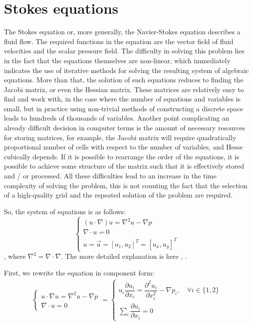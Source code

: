 \section{Stokes equations}
The Stokes equation or, more generally, the Navier-Stokes equation describes a fluid flow. The required functions in the equation are the vector field of fluid velocities and the scalar pressure field. The difficulty in solving this problem lies in the fact that the equations themselves are non-linear, which immediately indicates the use of iterative methods for solving the resulting system of algebraic equations. More than that, the solution of such equations reduces to finding the Jacobi matrix, or even the Hessian matrix. These matrices are relatively easy to find and work with, in the case where the number of equations and variables is small, but in practice using non-trivial methods of constructing a discrete space leads to hundreds of thousands of variables. Another point complicating an already difficult decision in computer terms is the amount of necessary resources for storing matrices, for example, the Jacobi matrix will require  quadratically proportional number of cells with respect to the number of variables, and Hesse cubically depends. If it is possible to rearrange the order of the equations, it is possible to achieve some structure of the matrix such that it is effectively stored and / or processed. All these difficulties lead to an increase in the time complexity of solving the problem, this is not counting the fact that the selection of a high-quality grid and the repeated solution of the problem are required.

So, the system of equations is as follows:
\begin{equation}
	\label{eq:stokes_sys}
	\begin{cases}
		\left ( u \cdot \nabla \right ) u = \nabla^2 u - \nabla p \\
		\nabla \cdot u = 0 \\
		u = \vec{u} =  \left [ u_1, u_2 \right ]^T = \left [ u_x, u_y \right ]^T
	\end{cases}
\end{equation}
, where $\nabla^2 = \nabla \cdot \nabla$. The more detailed explanation is here \cite{temam1979navier}, \cite{rieutord2014fluid}.

First, we rewrite the equation in component form:
\begin{equation}
	\begin{multlined}
		\begin{cases}
			u \cdot \nabla u = \nabla^2 u - \nabla p \\[10pt]
			\nabla \cdot u = 0
		\end{cases} = 
		\begin{cases}
			u_i \dfrac{\partial u_i}{\partial x_i} = \dfrac{\partial^2 u_i}{\partial x_i^2} - \nabla p_i, \quad \forall i \in \{1, 2\} \\[10pt]
			\sum_i \dfrac{\partial u_i}{\partial x_i} = 0
		\end{cases}
	\end{multlined}
\end{equation}

